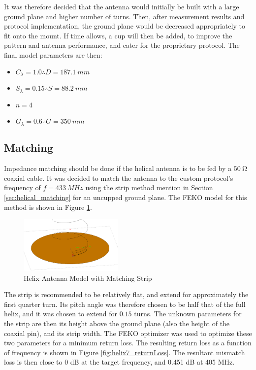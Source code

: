 It was therefore decided that the antenna would initially be built with a large ground plane and higher number of turns. Then, after measurement results and protocol implementation, the ground plane would be decreased appropriately to fit onto the mount. If time allows, a cup will then be added, to improve the pattern and antenna performance, and cater for the proprietary protocol. The final model parameters are then:
\begin{itemize}
    \item $C_\lambda = 1.0 \therefore D = \SI{187.1}{mm}$
    \item $S_\lambda = 0.15 \therefore S = \SI{88.2}{mm}$
    \item $n = 4$
    \item $G_\lambda = 0.6 \therefore G = \SI{350}{mm}$
\end{itemize}

\subsection{Matching}
Impedance matching should be done if the helical antenna is to be fed by a $\SI{50}{\ohm}$ coaxial cable. It was decided to match the antenna to the custom protocol's frequency of $f = \SI{433}{MHz}$ using the strip method mention in Section \ref{sec:helical_matching} for an uncupped ground plane. The FEKO model for this method is shown in Figure \ref{fig:helix7_model}.

\begin{figure}[!htb]
  \centering
  \includegraphics[width=0.45\textwidth]{helix7_model}
  \caption{Helix Antenna Model with Matching Strip}
  \label{fig:helix7_model}
\end{figure}

The strip is recommended to be relatively flat, and extend for approximately the first quarter turn. Its pitch angle was therefore chosen to be half that of the full helix, and it was chosen to extend for $0.15$ turns. The unknown parameters for the strip are then its height above the ground plane (also the height of the coaxial pin), and its strip width. The FEKO optimizer was used to optimize these two parameters for a minimum return loss. The resulting return loss as a function of frequency is shown in Figure \ref{fig:helix7_returnLoss}. The resultant mismatch loss is then close to 0 dB at the target frequency, and 0.451 dB at 405 MHz.

